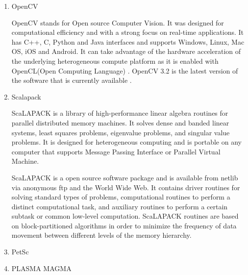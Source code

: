 \begin{enumerate}
\item {} 
OpenCV

OpenCV stands for Open source Computer Vision. It was designed for
computational efficiency and with a strong focus on real-time
applications. It has C++, C, Python and Java interfaces and
supports Windows, Linux, Mac OS, iOS and Android. It can take
advantage of the hardware acceleration of the underlying
heterogeneous compute platform as it is enabled with OpenCL(Open
Computing Language) \label{\detokenize{i524/technologies:id77}}{\hyperref[\detokenize{i524/technologies:www-opencv}]{\sphinxcrossref{{[}68{]}}}}. OpenCV 3.2 is the latest
version of the software that is currently available
\label{\detokenize{i524/technologies:id78}}{\hyperref[\detokenize{i524/technologies:opencv-version}]{\sphinxcrossref{{[}69{]}}}}.

\item {} 
Scalapack

ScaLAPACK is a library of high-performance linear algebra routines for
parallel distributed memory machines. It solves dense and banded
linear systems, least squares problems, eigenvalue problems, and
singular value problems. It is designed for heterogeneous computing
and is portable on any computer that supports Message Passing
Interface or Parallel Virtual Machine. \label{\detokenize{i524/technologies:id79}}{\hyperref[\detokenize{i524/technologies:www-scalapack}]{\sphinxcrossref{{[}70{]}}}}

ScaLAPACK is a open source software package and is available from
netlib via anonymous ftp and the World Wide Web. It contains driver
routines for solving standard types of problems, computational
routines to perform a distinct computational task, and auxiliary
routines to perform a certain subtask or common low-level
computation. ScaLAPACK routines are based on block-partitioned
algorithms in order to minimize the frequency of data movement between
different levels of the memory hierarchy.

\item {} 
PetSc

\item {} 
PLASMA MAGMA


\end{enumerate}
